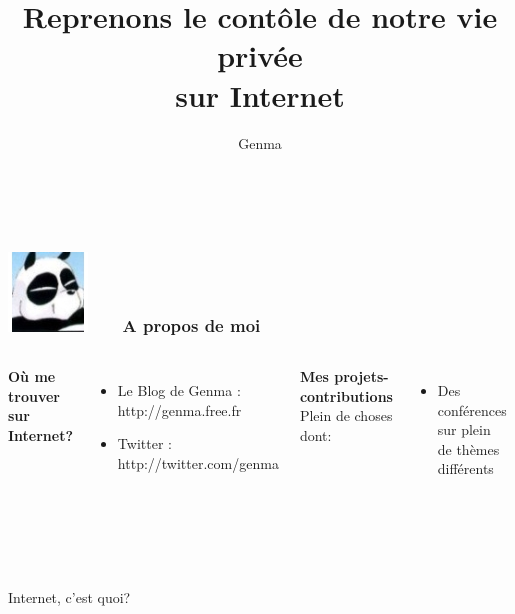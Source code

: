 \documentclass{beamer}
\title[Reprenons le contôle de notre vie privée sur Internet]{Reprenons le contôle de notre vie privée \\sur Internet}
\author{Genma}
\begin{document}
\begin{frame}
	\titlepage
	\vfill
	\begin{center}
		\\[2.5ex]
		{\tiny\CcNote{\CcLongnameByNcSa}}
		\vspace*{-2.5ex}
	\end{center}
\end{frame}

\begin{frame}
\frametitle{\includegraphics[scale=0.4]{./images/Genma.jpg} \ \ \  A propos de moi  }
\begin{columns}[c] 
\textbf{Où me trouver sur Internet?}
\begin{itemize}
\item Le Blog de Genma : http://genma.free.fr
\item Twitter : http://twitter.com/genma
\end{itemize}
\textbf{Mes projets-contributions}
\\ Plein de choses dont:
\begin{itemize}
\item Des conférences sur plein de thèmes différents
\end{itemize}
\includegraphics[width=5cm,height=5cm]{./images/blog.png} 
\end{columns}
\end{frame}

\begin{frame}
\begin{center}
\Huge{Internet, c'est quoi?}
\end{center}
\end{frame}
\end{document}
